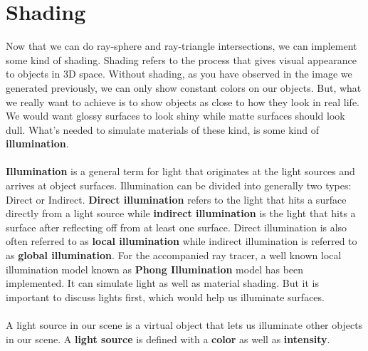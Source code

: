 \documentclass[11pt,a4paper]{article}
\begin{document}
	\section{Shading}
	Now that we can do ray-sphere and ray-triangle intersections, we can implement some kind of shading. Shading refers to the process that gives visual appearance to objects in 3D space. Without shading, as you have observed in the image we generated previously, we can only show constant colors on our objects. But, what we really want to achieve is to show objects as close to how they look in real life. We would want glossy surfaces to look shiny while matte surfaces should look dull. What's needed to simulate materials of these kind, is some kind of \textbf{illumination}.
	\\~\\
	\textbf{Illumination} is a general term for light that originates at the light sources and arrives at object surfaces. Illumination can be divided into generally two types: Direct or Indirect. \textbf{Direct illumination} refers to the light that hits a surface directly from a light source while \textbf{indirect illumination} is the light that hits a surface after reflecting off from at least one surface. Direct illumination is also often referred to as \textbf{local illumination} while indirect illumination is referred to as \textbf{global illumination}. For the accompanied ray tracer, a well known local illumination model known as \textbf{Phong Illumination} model \cite{phong} has been implemented. It can simulate light as well as material shading. But it is important to discuss lights first, which would help us illuminate surfaces.
	\\~\\
	A light source in our scene is a virtual object that lets us illuminate other objects in our scene. A \textbf{light source} is defined with a \textbf{color} as well as \textbf{intensity}.
\end{document}
